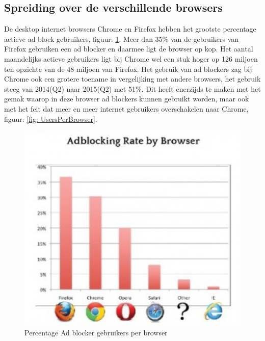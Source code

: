 \documentclass[pdftex,a4paper,12pt,twoside]{report}
\begin{document}
\subsection{Spreiding over de verschillende browsers}
\label{sec spreiding over de verschillende browsers}
De desktop internet browsers Chrome en Firefox hebben het grootste percentage actieve ad block gebruikers, figuur: \ref{fig: Ad-blocking-by-browse}. Meer dan 35\% van de gebruikers van Firefox gebruiken een ad blocker en daarmee ligt de browser op kop. Het aantal maandelijks actieve gebruikers ligt bij Chrome wel een stuk hoger op 126 miljoen ten opzichte van de 48 miljoen van Firefox. Het gebruik van ad blockers zag bij Chrome ook een grotere toename in vergelijking met andere browsers, het gebruik steeg van 2014(Q2) naar 2015(Q2) met 51\%. Dit heeft enerzijds te maken met het gemak waarop in deze browser ad blockers kunnen gebruikt worden, maar ook met het feit dat meer en meer internet gebruikers overschakelen naar Chrome, figuur: \ref{fig: UsersPerBrowser}.
\begin{figure}[h!]
\centering
\includegraphics[width=12cm]{img/Ad-blocking-by-browse}
\caption{Percentage Ad blocker gebruikers per browser}
\label{fig: Ad-blocking-by-browse}
\end{figure}
\end{document}
